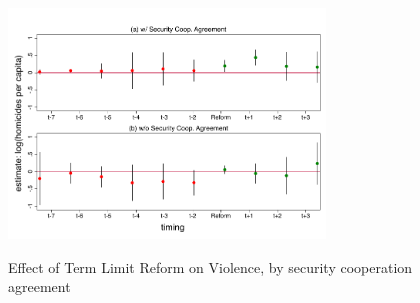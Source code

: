 \documentclass{beamer}
\begin{document}
\begin{frame}[label=mando_unico, noframenumbering]
 
\begin{figure}[h]  
\centering
\caption{Effect of Term Limit Reform on Violence, by security cooperation agreement} 
\label{fig:split_mando_unico}
  
\includegraphics[width=0.75\textwidth]{Figures_pres/event_study_wacuerdo2_placebo.pdf}
    
  \hyperlink{robustness}{} 
\end{figure} 
      
\end{frame} 
\end{document}
